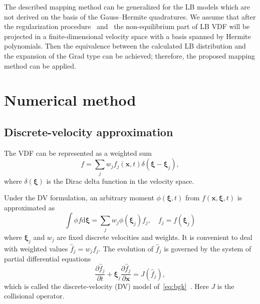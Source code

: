 \documentclass[]{elsarticle} %
\newcommand{\dd}{\mathrm{d}}
\newcommand{\pder}[2][]{\frac{\partial#1}{\partial#2}}
\newcommand{\dxi}{\boldsymbol{\dd\xi}}
\newcommand{\bxi}{\boldsymbol{\xi}}
\newcommand{\bx}{\boldsymbol{x}}
\begin{document}
{The described mapping method can be generalized for the LB models which are not derived on the basis of the Gauss--Hermite quadratures.
We assume that after the regularization procedure~\cite{Latt2006, Chen2006} and~\cite{Zhang2006, Mont2015, Mattila2017}
the non-equilibrium part of LB VDF will be projected in a finite-dimensional velocity space with a basis spanned by Hermite polynomials.
Then the equivalence between the calculated LB distribution and
the expansion of the Grad type can be achieved; therefore, the proposed mapping method can be applied.

\section{Numerical method}\label{sec:numerics}

\subsection{Discrete-velocity approximation}\label{sec:numerics:dv}

The VDF can be represented as a weighted sum
\begin{equation}\label{eq:discrete_velocity}
    f = \sum_j w_j f_j(\bx,t)\delta(\bxi-\bxi_j),
\end{equation}
where \(\delta(\bxi)\) is the Dirac delta function in the velocity space.

Under the DV formulation, an arbitrary moment \(\phi(\bxi,t)\) from \(f(\bx,\bxi,t)\) is approximated as
\begin{equation}\label{eq:cubature}
    \int \phi f\dxi = \sum_j w_j \phi(\bxi_j) f_j, \quad f_j = f(\bxi_j)
\end{equation}
where \(\bxi_j\) and \(w_j\) are fixed discrete velocities and weights.
It is convenient to deal with weighted values \(\hat{f}_j = w_jf_j\).
The evolution of \(\hat{f}_j\) is governed by the system of partial differential equations
\begin{equation}\label{eq:dvm}
    \pder[\hat{f}_j]{t} + \bxi_j\pder[\hat{f}_j]{\bx} = J(\hat{f}_j),
\end{equation}
which is called the discrete-velocity (DV) model of~\eqref{eq:bgk}~\cite{Cabannes1980}.
Here $J$ is the collisional operator.

}
\end{document}
